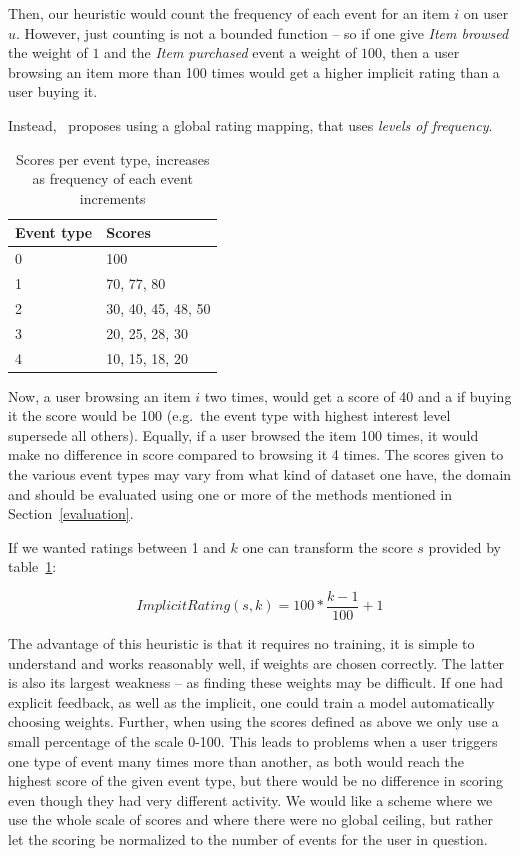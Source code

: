 Then, our heuristic would count the frequency of each event for an item $i$ on
user $u$. However, just counting is not a bounded function – so if one give
\textit{Item browsed} the weight of $1$ and the \textit{Item purchased} event
a weight of $100$, then a user browsing an item more than 100 times would get a
higher implicit rating than a user buying it.

Instead,~\cite{pkghost2014implicit} proposes using a global rating mapping,
that uses \textit{levels of frequency}.

\begin{table}[H]
  \centering
  \begin{tabular}{ll}
  \toprule
  Event type & Scores \\ \midrule
  0 & 100 \\
  1 & 70, 77, 80 \\
  2 & 30, 40, 45, 48, 50 \\
  3 & 20, 25, 28, 30 \\
  4 & 10, 15, 18, 20 \\
  \bottomrule
  \end{tabular}
  \caption{Scores per event type, increases as frequency of each event
           increments}
\label{implicit-table}
\end{table}


Now, a user browsing an item $i$ two times, would get a score of 40 and a if
buying it the score would be 100 (e.g.\ the event type with highest interest
level supersede all others). Equally, if a user browsed the item 100 times, it
would make no difference in score compared to browsing it 4 times. The scores
given to the various event types may vary from what kind of dataset one have,
the domain and should be evaluated using one or more of the methods mentioned
in Section~\ref{evaluation}.

If we wanted ratings between 1 and $k$ one can transform the score $s$ provided
by table~\ref{implicit-table}:

\begin{equation}
  ImplicitRating(s, k) = 100 * \frac{k-1}{100} + 1
\end{equation}

The advantage of this heuristic is that it requires no training, it is simple
to understand and works reasonably well, if weights are chosen correctly.
The latter is also its largest weakness – as finding these weights may be
difficult. If one had explicit feedback, as well as the implicit, one could
train a model automatically choosing weights. Further, when using the scores
defined as above we only use a small percentage of the scale 0-100. This leads
to problems when a user triggers one type of event many times more than
another, as both would reach the highest score of the given event type, but
there would be no difference in scoring even though they had very different
activity. We would like a scheme where we use the whole scale of scores and
where there were no global ceiling, but rather let the scoring be normalized to
the number of events for the user in question.


